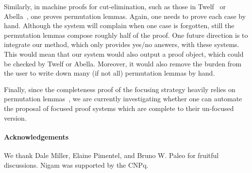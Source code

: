 \documentclass{new_tlp}
\begin{document}
Similarly, in machine proofs for cut-elimination, such as those in Twelf~\cite{schurmann00phd} or 
Abella~\cite{abella.website}, one proves permutation lemmas. Again, one needs to prove each 
case by hand. Although the system will complain when one case is forgotten, still the permutation lemmas
compose roughly half of the proof. One future direction is to integrate 
our method, which only provides yes/no answers, with these systems. This would mean that 
our system would also output a proof object, which could be checked by Twelf or Abella.
Moreover, it would also remove the burden from the user to write down many (if not all) permutation 
lemmas by hand.


Finally, since the completeness proof of the focusing strategy heavily relies on permutation lemmas~\cite{miller07cslb}, 
we are currently investigating whether one can automate the proposal of focused proof
systems which are complete to their un-focused version. 


\paragraph{Acknowledgements} We thank Dale Miller, Elaine
Pimentel, and Bruno W. Paleo for fruitful discussions. Nigam was supported
by the CNPq.


% 
% 
\end{document}
